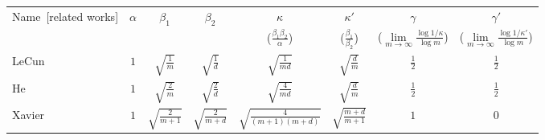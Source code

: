 \documentclass[twoside,11pt]{article}
\begin{document}
\begin{table}[ht]\footnotesize
    \centering
    \begin{tabularx}{\textwidth}{lccccccc}
        \toprule
        \multirow{2}{*}{Name~\scriptsize{[{related works}]}}                                      & \multirow{2}{*}{$\alpha$} & \multirow{2}{*}{$\beta_1$} & \multirow{2}{*}{$\beta_2$} & $\kappa$                                            & $\kappa'$                                     & $\gamma$                                                                  & $\gamma'$                                                                   \\
                                                                                                  &                           &                            &                            & ($\scriptscriptstyle\frac{\beta_1\beta_2}{\alpha}$) & ($\scriptscriptstyle\frac{\beta_1}{\beta_2}$) & ($\scriptscriptstyle\lim\limits_{m\to\infty}\frac{\log1/\kappa}{\log m}$) & ($\scriptscriptstyle\lim\limits_{m\to\infty}\frac{\log 1/\kappa'}{\log m}$) \\
        \midrule
        LeCun~\scriptsize{\cite{lecun2012efficient}}                                              & $1$                       & $\sqrt{\frac{1}{m}}$       & $\sqrt{\frac{1}{d}}$       & $\sqrt{\frac{1}{md}}$                               & $\sqrt{\frac{d}{m}}$                          & $\frac{1}{2}$                                                             & $\frac{1}{2}$                                                               \\
        He~\scriptsize{\cite{he2015delving}}                                                      & $1$                       & $\sqrt{\frac{2}{m}}$       & $\sqrt{\frac{2}{d}}$       & $\sqrt{\frac{4}{md}}$                               & $\sqrt{\frac{d}{m}}$                          & $\frac{1}{2}$                                                             & $\frac{1}{2}$                                                               \\
        Xavier~\scriptsize{\cite{glorot2010understanding}}                                        & $1$                       & $\sqrt{\frac{2}{m+1}}$     & $\sqrt{\frac{2}{m+d}}$     & $\sqrt{\frac{4}{(m+1)(m+d)}}$                       & $\sqrt{\frac{m+d}{m+1}}$                      & $1$                                                                       & $0$                                                                         \\

\end{tabularx}
\end{table}
\end{document}
